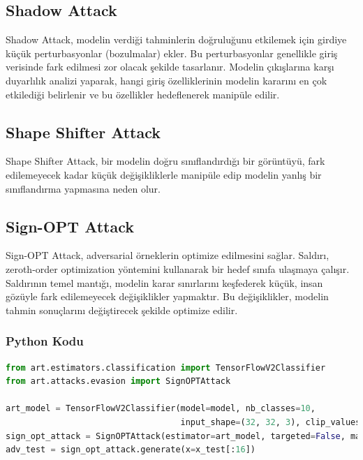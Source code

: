 \newpage

\subsection{Shadow Attack}

Shadow Attack, modelin verdiği tahminlerin doğruluğunu etkilemek için girdiye küçük perturbasyonlar (bozulmalar) ekler. Bu perturbasyonlar genellikle giriş verisinde fark edilmesi zor olacak şekilde tasarlanır. Modelin çıkışlarına karşı duyarlılık analizi yaparak, hangi giriş özelliklerinin modelin kararını en çok etkilediği belirlenir ve bu özellikler hedeflenerek manipüle edilir.

\newpage

\subsection{Shape Shifter Attack}

Shape Shifter Attack, bir modelin doğru sınıflandırdığı bir görüntüyü, fark edilemeyecek kadar küçük değişikliklerle manipüle edip modelin yanlış bir sınıflandırma yapmasına neden olur.

\newpage

\subsection{Sign-OPT Attack}

Sign-OPT Attack, adversarial örneklerin optimize edilmesini sağlar. Saldırı, zeroth-order optimization yöntemini kullanarak bir hedef sınıfa ulaşmaya çalışır. Saldırının temel mantığı, modelin karar sınırlarını keşfederek küçük, insan gözüyle fark edilemeyecek değişiklikler yapmaktır. Bu değişiklikler, modelin tahmin sonuçlarını değiştirecek şekilde optimize edilir.

\subsubsection{Python Kodu}

\begin{lstlisting}[language=Python]
from art.estimators.classification import TensorFlowV2Classifier
from art.attacks.evasion import SignOPTAttack

art_model = TensorFlowV2Classifier(model=model, nb_classes=10, 
                                   input_shape=(32, 32, 3), clip_values=(0, 1))
sign_opt_attack = SignOPTAttack(estimator=art_model, targeted=False, max_iter=100, query_limit=2000)
adv_test = sign_opt_attack.generate(x=x_test[:16])
\end{lstlisting}

